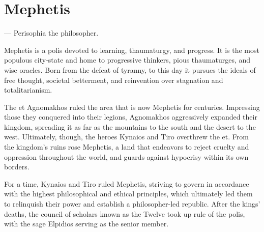 \section{Mephetis} \label{sec::mephetis} %

\hspace*{\fill} --- Perisophia the philosopher.

\thispagestyle{empty} %

Mephetis is a polis devoted to learning, thaumaturgy, and progress.
It is the most populous city-state and home to progressive thinkers, pious thaumaturges, and wise oracles.
Born from the defeat of tyranny, to this day it pursues the ideals of free thought, societal betterment, and reinvention over stagnation and totalitarianism.

The et Agnomakhos ruled the area that is now Mephetis for centuries.
Impressing those they conquered into their legions, Agnomakhos aggressively expanded their kingdom, spreading it as far as the mountains to the south and the desert to the west.
Ultimately, though, the heroes Kynaios and Tiro overthrew the et.
From the kingdom's ruins rose Mephetis, a land that endeavors to reject cruelty and oppression throughout the world, and guards against hypocrisy within its own borders.

For a time, Kynaios and Tiro ruled Mephetis, striving to govern in accordance with the highest philosophical and ethical principles, which ultimately led them to relinquish their power and establish a philosopher-led republic.
After the kings' deaths, the council of scholars known as the Twelve took up rule of the polis, with the sage Elpidios serving as the senior member.

